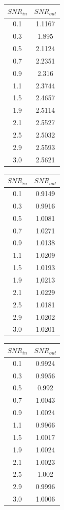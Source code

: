 \begin{tabular}{|c|c|}
\hline
$SNR_{in}$ & $SNR_{out}$\\ \hline
0.1 & 1.1167\\ \hline
0.3 & 1.895\\ \hline
0.5 & 2.1124\\ \hline
0.7 & 2.2351\\ \hline
0.9 & 2.316\\ \hline
1.1 & 2.3744\\ \hline
1.5 & 2.4657\\ \hline
1.9 & 2.5114\\ \hline
2.1 & 2.5527\\ \hline
2.5 & 2.5032\\ \hline
2.9 & 2.5593\\ \hline
3.0 & 2.5621\\ \hline
\end{tabular}
\begin{tabular}{|c|c|}
\hline
$SNR_{in}$ & $SNR_{out}$\\ \hline
0.1 & 0.9149\\ \hline
0.3 & 0.9916\\ \hline
0.5 & 1.0081\\ \hline
0.7 & 1.0271\\ \hline
0.9 & 1.0138\\ \hline
1.1 & 1.0209\\ \hline
1.5 & 1.0193\\ \hline
1.9 & 1,0213\\ \hline
2.1 & 1.0229\\ \hline
2.5 & 1.0181\\ \hline
2.9 & 1.0202\\ \hline
3.0 & 1.0201\\ \hline
\end{tabular}
\begin{tabular}{|c|c|}
\hline
$SNR_{in}$ & $SNR_{out}$\\ \hline
0.1 & 0.9924\\ \hline
0.3 & 0.9956\\ \hline
0.5 & 0.992\\ \hline
0.7 & 1.0043\\ \hline
0.9 & 1.0024\\ \hline
1.1 & 0.9966\\ \hline
1.5 & 1.0017\\ \hline
1.9 & 1.0024\\ \hline
2.1 & 1.0023\\ \hline
2.5 & 1.002\\ \hline
2.9 & 0.9996\\ \hline
3.0 & 1.0006\\ \hline
\end{tabular}

